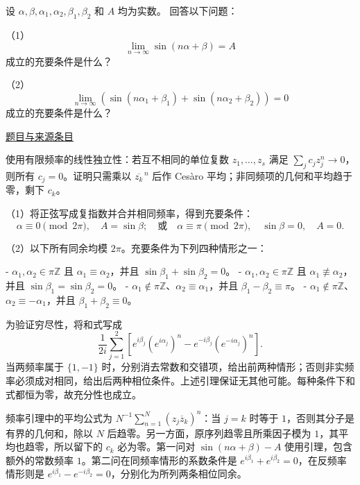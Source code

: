 \documentclass[12pt,fontset=fandol]{ctexart}
\begin{document}
\begin{example}\label{ex:fin12-low:8}\label{pr:fin12-low:8}

设 $\alpha, \beta, \alpha_{1}, \alpha_{2}, \beta_{1}, \beta_{2}$ 和 $A$ 均为实数。 回答以下问题：

（1）\[
\lim_{n \to \infty} \sin(n\alpha + \beta) = A
\]
成立的充要条件是什么？

（2）\[
\lim_{n \to \infty} \left(\sin(n\alpha_1 + \beta_1) + \sin(n\alpha_2 + \beta_2)\right) = 0
\]
成立的充要条件是什么？

\par\href{https://github.com/lzxcr/cmc-mathematics/blob/64916fa1fdbc3e444a652eca204d5669058ee321/src/problems/finals/12/08.md}{题目与来源条目}

\end{example}

\begin{solve}\label{ans:fin12-low:8}

使用有限频率的线性独立性：若互不相同的单位复数 $z_1,\ldots,z_s$ 满足 $\sum_jc_jz_j^n\to0$，则所有 $c_j=0$。证明只需乘以 $\overline{z_k}^{\,n}$ 后作 Cesàro 平均；非同频项的几何和平均趋于零，剩下 $c_k$。

（1）将正弦写成复指数并合并相同频率，得到充要条件：
\[
\alpha\equiv0\pmod{2\pi},\quad A=\sin\beta;
\quad\text{或}\quad
\alpha\equiv\pi\pmod{2\pi},\quad\sin\beta=0,\quad A=0.
\]

（2）以下所有同余均模 $2\pi$。充要条件为下列四种情形之一：

- $\alpha_1,\alpha_2\in\pi\mathbb Z$ 且 $\alpha_1\equiv\alpha_2$，并且 $\sin\beta_1+\sin\beta_2=0$。
- $\alpha_1,\alpha_2\in\pi\mathbb Z$ 且 $\alpha_1\not\equiv\alpha_2$，并且 $\sin\beta_1=\sin\beta_2=0$。
- $\alpha_1\notin\pi\mathbb Z$、$\alpha_2\equiv\alpha_1$，并且 $\beta_1-\beta_2\equiv\pi$。
- $\alpha_1\notin\pi\mathbb Z$、$\alpha_2\equiv-\alpha_1$，并且 $\beta_1+\beta_2\equiv0$。

为验证穷尽性，将和式写成
\[
\frac1{2i}\sum_{j=1}^2\left[e^{i\beta_j}(e^{i\alpha_j})^n-e^{-i\beta_j}(e^{-i\alpha_j})^n\right].
\]
当两频率属于 $\{1,-1\}$ 时，分别消去常数和交错项，给出前两种情形；否则非实频率必须成对相同，给出后两种相位条件。上述引理保证无其他可能。每种条件下和式都恒为零，故充分性也成立。

频率引理中的平均公式为 $N^{-1}\sum_{n=1}^N(z_j\overline z_k)^n$：当 $j=k$ 时等于 $1$，否则其分子是有界的几何和，除以 $N$ 后趋零。另一方面，原序列趋零且所乘因子模为 $1$，其平均也趋零，所以留下的 $c_k$ 必为零。第一问对 $\sin(n\alpha+\beta)-A$ 使用引理，包含额外的常数频率 $1$。第二问在同频率情形的系数条件是 $e^{i\beta_1}+e^{i\beta_2}=0$，在反频率情形则是 $e^{i\beta_1}-e^{-i\beta_2}=0$，分别化为所列两条相位同余。

\end{solve}
\end{document}
